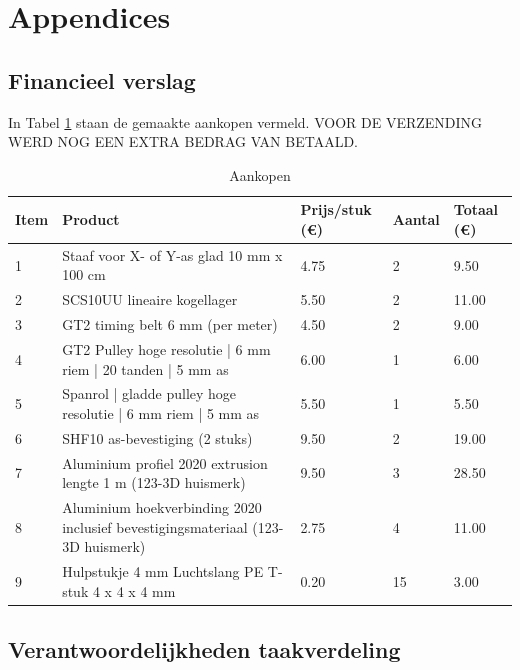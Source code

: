\documentclass[a4paper,twoside,kulak]{kulakreport} %
\begin{document}
\chapter*{Appendices}
\section*{Financieel verslag}

In Tabel \ref{tab:financieelVerslag} staan de gemaakte aankopen vermeld. VOOR DE VERZENDING WERD NOG EEN EXTRA BEDRAG VAN    BETAALD.


\begin{table}[]
	\sffamily
	\label{tab:financieelVerslag}
	\caption{Aankopen}
	\begin{tabular}{@{}lllll@{}}
		\toprule
		  Item & Product & Prijs/stuk (\euro) & Aantal & Totaal (\euro)   \\ \midrule
		1 & Staaf voor X- of Y-as glad 10 mm x 100 cm & 4.75 & 2 & 9.50 \\
		2 & SCS10UU lineaire kogellager  & 5.50 & 2 & 11.00 \\
		3 & GT2 timing belt 6 mm (per meter)  & 4.50 & 2 & 9.00 \\
		4 & GT2 Pulley hoge resolutie | 6 mm riem | 20 tanden | 5 mm as & 6.00 & 1 & 6.00 \\
		5 & Spanrol | gladde pulley hoge resolutie | 6 mm riem | 5 mm as & 5.50 & 1 & 5.50 \\
		6 & SHF10 as-bevestiging (2 stuks) & 9.50 & 2 & 19.00 \\
		7 & Aluminium profiel 2020 extrusion lengte 1 m (123-3D huismerk)  & 9.50 & 3 & 28.50 \\
		8 & Aluminium hoekverbinding 2020 inclusief bevestigingsmateriaal (123-3D huismerk) & 2.75 & 4 & 11.00 \\
		9 & Hulpstukje 4 mm Luchtslang PE T-stuk 4 x 4 x 4 mm & 0.20 & 15 & 3.00 \\
		\bottomrule
	\end{tabular}

	
\end{table}

\clearpage

\section*{Verantwoordelijkheden taakverdeling}
\end{document}
